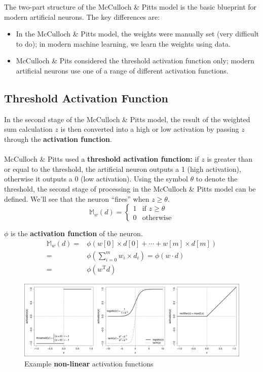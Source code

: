 \documentclass[a4paper,11pt]{article}
\begin{document}
The two-part structure of the McCulloch \& Pitts model is the basic blueprint for modern artificial neurons.
The key differences are:
\begin{itemize}
    \item   In the McCulloch \& Pitts model, the weights were manually set (very difficult to do);
            in modern machine learning, we learn the weights using data.
    \item   McCulloch \& Pits considered the threshold activation function only; modern artificial neurons use one of a range of different activation functions.
\end{itemize}

\subsection{Threshold Activation Function}
In the second stage of the McCulloch \& Pitts model, the result of the weighted sum calculation $z$ is then converted into a high or low activation by passing $z$ through the \textbf{activation function}.
\\\\
McCulloch \& Pitts used a \textbf{threshold activation function:} if $z$ is greater than or equal to the threshold, the artificial neuron outputs a 1 (high activation), otherwise it outputs a 0 (low activation).
Using the symbol $\theta$ to denote the threshold, the second stage of processing in the McCulloch \& Pitts model can be defined.
We'll see that the neuron ``fires'' when $z \geq \theta$.
\[
    \mathbb{M}_w(d) = 
    \begin{cases}
        1 & \text{if } z \geq \theta \\
        0 & \text{otherwise}
    \end{cases}
\]

$\phi$ is the \textbf{activation function} of the neuron.
\begin{align*}
    \mathbb{M}_w(d) =& \phi (w[0] \times d[0] + \cdots + w[m] \times d[m]) \\
    =& \phi \left( \sum^m_{i=0} w_i \times d_i \right) = \phi \left( w \cdot d \right) \\
    =& \phi \left(  w^{\text{T}}d \right)
\end{align*}

\begin{figure}[H]
    \centering
    \includegraphics[width=\textwidth]{images/nonlinearactivationfunctions.png}
    \caption{ Example \textbf{non-linear} activation functions }
\end{figure}
\end{document}
